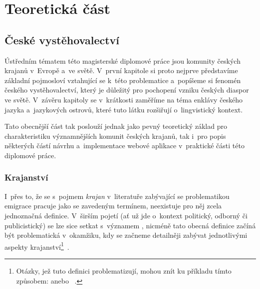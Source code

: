\part{Teoretická část}

\hypertarget{ux10deskuxe9-vystux11bhovalectvuxed}{%
\chapter{České vystěhovalectví}\label{ux10deskuxe9-vystux11bhovalectvuxed}}

Ústředním tématem této magisterské diplomové práce jsou komunity českých krajanů v~Evropě a~ve světě. V~první kapitole si proto nejprve představíme základní pojmosloví vztahující se k~této problematice a~popíšeme si fenomén českého vystěhovalectví, který je důležitý pro pochopení vzniku českých diaspor ve světě. V~závěru kapitoly se v~krátkosti zaměříme na téma enklávy českého jazyka a~jazykových ostrovů, které tuto látku rozšiřují o~lingvistický kontext.

Tato obecnější část tak poslouží jednak jako pevný teoretický základ pro charakteristiku významnějších komunit českých krajanů, tak i~pro popis některých částí návrhu a~implementace webové aplikace v~praktické části této diplomové práce.

\hypertarget{krajanstvuxed}{%
\section{Krajanství}\label{krajanstvuxed}}

I~přes to, že se s~pojmem \emph{krajan} v~literatuře zabývající se problematikou emigrace pracuje jako se zavedeným termínem, neexistuje pro něj zcela jednoznačná definice. V~širším pojetí (ať už jde o~kontext politický, odborný či publicistický) se lze sice setkat s~významem , nicméně tato obecná definice začíná být problematická v~okamžiku, kdy se začneme detailněji zabývat jednotlivými aspekty krajanství\footnote{Otázky, jež tuto definici problematizují, mohou znít ku příkladu tímto způsobem:  anebo ~\parencite{Jakoubek2015}.}~\parencite{Jakoubek2015}.

